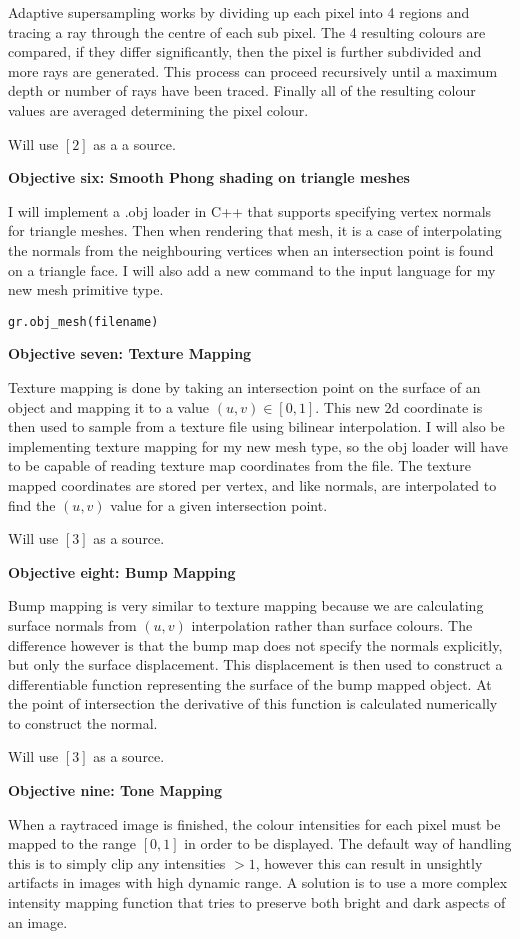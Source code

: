 \documentclass {article}
\begin{document}
\begin{description}
Adaptive supersampling works by dividing up each pixel into 4 regions and tracing a ray through the centre of each sub pixel. The 4 resulting colours are compared, if they differ significantly, then the pixel is further subdivided and more rays are generated. This process can proceed recursively until a maximum depth or number of rays have been traced. Finally all of the resulting colour values are averaged determining the pixel colour.

Will use $[2]$ as a a source.

{\bf Objective six: Smooth Phong shading on triangle meshes}

I will implement a .obj loader in C++ that supports specifying vertex normals for triangle meshes. Then when rendering that mesh, it is a case of interpolating the normals from the neighbouring vertices when an intersection point is found on a triangle face. I will also add a new command to the input language for my new mesh primitive type.

{\tt gr.obj\_mesh(filename)}

{\bf Objective seven: Texture Mapping}

Texture mapping is done by taking an intersection point on the surface of an object and mapping it to a value $(u,v) \in [0,1]$. This new 2d coordinate is then used to sample from a texture file using bilinear interpolation.
I will also be implementing texture mapping for my new mesh type, so the obj loader will have to be capable of reading texture map coordinates from the file. The texture mapped coordinates are stored per vertex, and like normals, are interpolated to find the $(u,v)$ value for a given intersection point.

Will use $[3]$ as a source.

{\bf Objective eight: Bump Mapping}

Bump mapping is very similar to texture mapping because we are calculating surface normals from $(u,v)$ interpolation rather than surface colours. The difference however is that the bump map does not specify the normals explicitly, but only the surface displacement. This displacement is then used to construct a differentiable function representing the surface of the bump mapped object. At the point of intersection the derivative of this function is calculated numerically to construct the normal.

Will use $[3]$ as a source.

{\bf Objective nine: Tone Mapping}

When a raytraced image is finished, the colour intensities for each pixel must be mapped to the range $[0,1]$ in order to be displayed. The default way of handling this is to simply clip any intensities $>1$, however this can result in unsightly artifacts in images with high dynamic range. A solution is to use a more complex intensity mapping function that tries to preserve both bright and dark aspects of an image.


\end{description}
\end{document}
